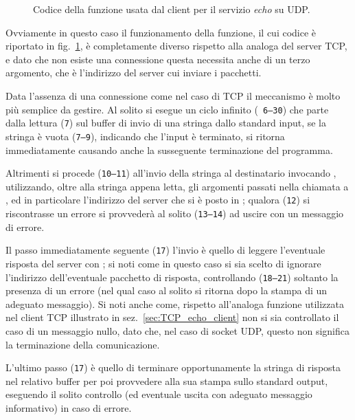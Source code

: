 \begin{figure}[!htbp] 
  \footnotesize \centering
  \begin{minipage}[c]{\codesamplewidth}
  \end{minipage}
  \normalsize
  \caption{Codice della funzione  usata dal client per il
    servizio \textit{echo} su UDP.}
  \label{fig:UDP_echo_client_echo}
\end{figure}

Ovviamente in questo caso il funzionamento della funzione, il cui codice è
riportato in fig.~\ref{fig:UDP_echo_client_echo}, è completamente diverso
rispetto alla analoga del server TCP, e dato che non esiste una connessione
questa necessita anche di un terzo argomento, che è l'indirizzo del server cui
inviare i pacchetti.

Data l'assenza di una connessione come nel caso di TCP il meccanismo è molto
più semplice da gestire. Al solito si esegue un ciclo infinito (\texttt{\small
  6--30}) che parte dalla lettura (\texttt{\small 7}) sul buffer di invio
 di una stringa dallo standard input, se la stringa è vuota
(\texttt{\small 7--9}), indicando che l'input è terminato, si ritorna
immediatamente causando anche la susseguente terminazione del programma.

Altrimenti si procede (\texttt{\small 10--11}) all'invio della stringa al
destinatario invocando , utilizzando, oltre alla stringa appena
letta, gli argomenti passati nella chiamata a , ed in
particolare l'indirizzo del server che si è posto in ; qualora
(\texttt{\small 12}) si riscontrasse un errore si provvederà al solito
(\texttt{\small 13--14}) ad uscire con un messaggio di errore.

Il passo immediatamente seguente (\texttt{\small 17}) l'invio è quello di
leggere l'eventuale risposta del server con ; si noti come in
questo caso si sia scelto di ignorare l'indirizzo dell'eventuale pacchetto di
risposta, controllando (\texttt{\small 18--21}) soltanto la presenza di un
errore (nel qual caso al solito si ritorna dopo la stampa di un adeguato
messaggio). Si noti anche come, rispetto all'analoga funzione
 utilizzata nel client TCP illustrato in
sez.~\ref{sec:TCP_echo_client} non si sia controllato il caso di un messaggio
nullo, dato che, nel caso di socket UDP, questo non significa la terminazione
della comunicazione.

L'ultimo passo (\texttt{\small 17}) è quello di terminare opportunamente la
stringa di risposta nel relativo buffer per poi provvedere alla sua stampa
sullo standard output, eseguendo il solito controllo (ed eventuale uscita con
adeguato messaggio informativo) in caso di errore.

